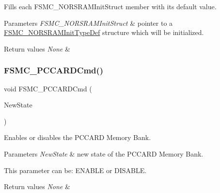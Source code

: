 Fills each F\+S\+M\+C\+\_\+\+N\+O\+R\+S\+R\+A\+M\+Init\+Struct member with its default value. 


\begin{DoxyParams}{Parameters}
{\em F\+S\+M\+C\+\_\+\+N\+O\+R\+S\+R\+A\+M\+Init\+Struct} & pointer to a \mbox{\hyperlink{struct_f_s_m_c___n_o_r_s_r_a_m_init_type_def}{F\+S\+M\+C\+\_\+\+N\+O\+R\+S\+R\+A\+M\+Init\+Type\+Def}} structure which will be initialized. \\
\hline
\end{DoxyParams}

\begin{DoxyRetVals}{Return values}
{\em None} & \\
\hline
\end{DoxyRetVals}
\mbox{\label{group___f_s_m_c___exported___functions_ga2d410151ceb3428c6a1bf374a0472cde}} 
\subsubsection{\texorpdfstring{FSMC\_PCCARDCmd()}{FSMC\_PCCARDCmd()}}
{\footnotesize\ttfamily void F\+S\+M\+C\+\_\+\+P\+C\+C\+A\+R\+D\+Cmd (\begin{DoxyParamCaption}\item[{\mbox{\hyperlink{group___exported__types_gac9a7e9a35d2513ec15c3b537aaa4fba1}{Functional\+State}}}]{New\+State }\end{DoxyParamCaption})}



Enables or disables the P\+C\+C\+A\+RD Memory Bank. 


\begin{DoxyParams}{Parameters}
{\em New\+State} & new state of the P\+C\+C\+A\+RD Memory Bank.\\
\hline
\end{DoxyParams}
This parameter can be\+: E\+N\+A\+B\+LE or D\+I\+S\+A\+B\+LE. 
\begin{DoxyRetVals}{Return values}
{\em None} & \\
\hline
\end{DoxyRetVals}
\mbox{\label{group___f_s_m_c___exported___functions_ga2f53ccf3a4f3c80a5a56fb47ccd47ccd}} 
